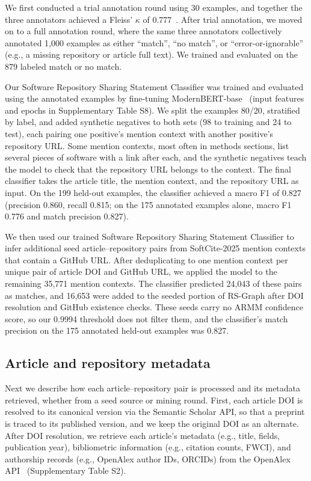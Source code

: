 \documentclass[pdflatex,sn-nature]{sn-jnl}%
\begin{document}
We first conducted a trial annotation round using 30 examples, and together the three annotators achieved a Fleiss' $\kappa$ of 0.777~\cite{fleiss1971measuring}.
After trial annotation, we moved on to a full annotation round, where the same three annotators collectively annotated 1,000 examples as either ``match'', ``no match'', or ``error-or-ignorable'' (e.g., a missing repository or article full text).
We trained and evaluated on the 879 labeled match or no match.

Our Software Repository Sharing Statement Classifier was trained and evaluated using the annotated examples by fine-tuning ModernBERT-base~\cite{warner2025smarter} (input features and epochs in Supplementary Table S8).
We split the examples 80/20, stratified by label, and added synthetic negatives to both sets (98 to training and 24 to test), each pairing one positive's mention context with another positive's repository URL.
Some mention contexts, most often in methods sections, list several pieces of software with a link after each, and the synthetic negatives teach the model to check that the repository URL belongs to the context.
The final classifier takes the article title, the mention context, and the repository URL as input.
On the 199 held-out examples, the classifier achieved a macro F1 of 0.827 (precision 0.860, recall 0.815; on the 175 annotated examples alone, macro F1 0.776 and match precision 0.827).

We then used our trained Software Repository Sharing Statement Classifier to infer additional seed article--repository pairs from SoftCite-2025 mention contexts that contain a GitHub URL.
After deduplicating to one mention context per unique pair of article DOI and GitHub URL, we applied the model to the remaining 35,771 mention contexts.
The classifier predicted 24,043 of these pairs as matches, and 16,653 were added to the seeded portion of RS-Graph after DOI resolution and GitHub existence checks.
These seeds carry no ARMM confidence score, so our 0.9994 threshold does not filter them, and the classifier's match precision on the 175 annotated held-out examples was 0.827.

\subsection{Article and repository metadata}\label{subsec:m-metadata}

Next we describe how each article--repository pair is processed and its metadata retrieved, whether from a seed source or mining round.
First, each article DOI is resolved to its canonical version via the Semantic Scholar API, so that a preprint is traced to its published version, and we keep the original DOI as an alternate.
After DOI resolution, we retrieve each article's metadata (e.g., title, fields, publication year), bibliometric information (e.g., citation counts, FWCI), and authorship records (e.g., OpenAlex author IDs, ORCIDs) from the OpenAlex API~\cite{priem2022openalex} (Supplementary Table S2).
\end{document}
